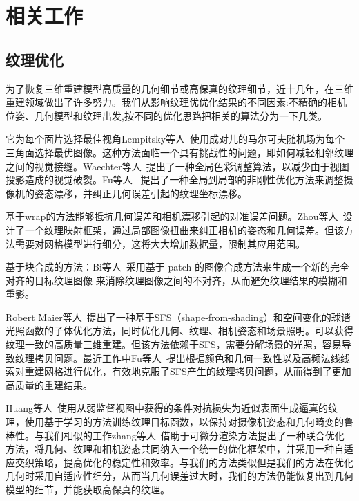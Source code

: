 \section{相关工作}
\subsection{纹理优化}
为了恢复三维重建模型高质量的几何细节或高保真的纹理细节，近十几年，在三维重建领域做出了许多努力。我们从影响纹理优优化结果的不同因素:不精确的相机位姿、几何模型和纹理出发,按不同的优化思路把相关的算法分为一下几类。\par
\vspace*{2mm}它为每个面片选择最佳视角Lempitsky等人~\cite{lempitsky2007seamless}使用成对儿的马尔可夫随机场为每个三角面选择最优图像。这种方法面临一个具有挑战性的问题，即如何减轻相邻纹理之间的视觉接缝。Waechter等人~\cite{waechter2014let}提出了一种全局色彩调整算法，以减少由于视图投影造成的视觉破裂。Fu等人~\cite{fu2018texture} 提出了一种全局到局部的非刚性优化方法来调整摄像机的姿态漂移，并纠正几何误差引起的纹理坐标漂移。\par
\vspace*{2mm}基于wrap的方法能够抵抗几何误差和相机漂移引起的对准误差问题。Zhou等人~\cite{zhou2014color}设计了一个纹理映射框架，通过局部图像扭曲来纠正相机的姿态和几何误差。但该方法需要对网格模型进行细分，这将大大增加数据量，限制其应用范围。\par
基于块合成的方法：Bi等人~\cite{bi2017patch}采用基于 patch 的图像合成方法来生成一个新的完全对齐的目标纹理图像 来消除纹理图像之间的不对齐，从而避免纹理结果的模糊和重影。\par
\vspace*{2mm}Robert Maier等人~\cite{RobertMaier2017Intrinsic3DH3}提出了一种基于SFS（shape-from-shading）和空间变化的球谐光照函数的子体优化方法，同时优化几何、纹理、相机姿态和场景照明。可以获得纹理一致的高质量三维重建。但该方法依赖于SFS，需要分解场景的光照，容易导致纹理拷贝问题。最近工作中Fu等人~\cite{YanpingFu2020JointTA}提出根据颜色和几何一致性以及高频法线线索对重建网格进行优化，有效地克服了SFS产生的纹理拷贝问题，从而得到了更加高质量的重建结果。\par
\vspace*{2mm}Huang等人~\cite{JingweiHuang2020AdversarialTO}使用从弱监督视图中获得的条件对抗损失为近似表面生成逼真的纹理，使用基于学习的方法训练纹理目标函数，以保持对摄像机姿态和几何畸变的鲁棒性。与我们相似的工作zhang等人~\cite{9705143}借助于可微分渲染方法提出了一种联合优化方法，将几何、纹理和相机姿态共同纳入一个统一的优化框架中，并采用一种自适应交织策略，提高优化的稳定性和效率。与我们的方法类似但是我们的方法在优化几何时采用自适应性细分，从而当几何误差过大时，我们的方法仍能恢复出到几何模型的细节，并能获取高保真的纹理。
